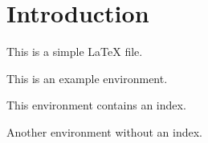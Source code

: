 \documentclass{article}
\begin{document}
\section{Introduction}
This is a simple LaTeX file.
\begin{example} 
This is an example environment.
\end{example}
\begin{hProposition} 
This environment contains an index.
\end{hProposition}
\begin{theorem} 
Another environment without an index.
\end{theorem}
\end{document}
